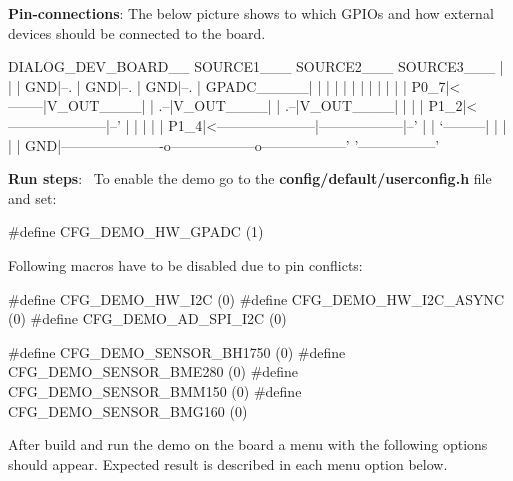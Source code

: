 \begin{DoxyItemize}
\item {\bfseries Pin-\/connections}\+: The below picture shows to which G\+P\+I\+Os and how external devices should be connected to the board.
\end{DoxyItemize}


\begin{DoxyPre}
   DIALOG\_DEV\_BOARD\_\_          SOURCE1\_\_\_         SOURCE2\_\_\_         SOURCE3\_\_\_
   |                 |         |      GND|--.     |      GND|--.     |      GND|--.
   |       GPADC\_\_\_\_\_|         |         |  |     |         |  |     |         |  |
   |       |     P0\_7|<--------|V\_OUT\_\_\_\_|  |  .--|V\_OUT\_\_\_\_|  |  .--|V\_OUT\_\_\_\_|  |
   |       |     P1\_2|<---------------------|--'               |  |               |
   |       |     P1\_4|<---------------------|------------------|--'               |
   |       `---------|                      |                  |                  |
   |              GND|----------------------o------------------o------------------'
   '-----------------'
\end{DoxyPre}



\begin{DoxyItemize}
\item {\bfseries Run steps}\+:~\newline
 To enable the demo go to the {\bfseries {\ttfamily config/default/userconfig.\+h}} file and set\+: 
\begin{DoxyCode}
\textcolor{preprocessor}{#define CFG\_DEMO\_HW\_GPADC       (1)}
\end{DoxyCode}
 Following macros have to be disabled due to pin conflicts\+: 
\begin{DoxyCode}
\textcolor{preprocessor}{#define CFG\_DEMO\_HW\_I2C         (0)}
\textcolor{preprocessor}{#define CFG\_DEMO\_HW\_I2C\_ASYNC   (0)}
\textcolor{preprocessor}{#define CFG\_DEMO\_AD\_SPI\_I2C     (0)}

\textcolor{preprocessor}{#define CFG\_DEMO\_SENSOR\_BH1750  (0)}
\textcolor{preprocessor}{#define CFG\_DEMO\_SENSOR\_BME280  (0)}
\textcolor{preprocessor}{#define CFG\_DEMO\_SENSOR\_BMM150  (0)}
\textcolor{preprocessor}{#define CFG\_DEMO\_SENSOR\_BMG160  (0)}
\end{DoxyCode}
 After build and run the demo on the board a menu with the following options should appear. Expected result is described in each menu option below.
\end{DoxyItemize}

